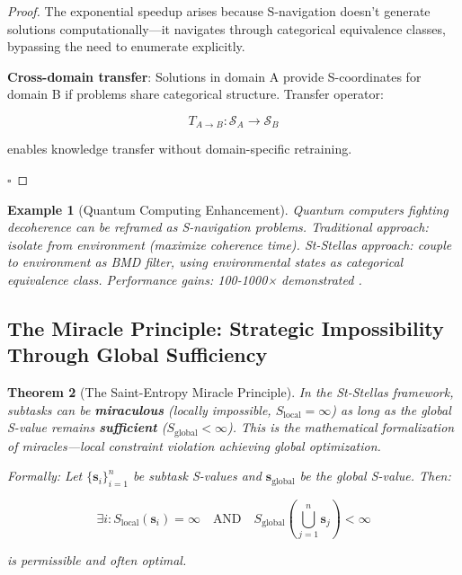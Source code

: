 \documentclass[12pt,a4paper]{article}
\newtheorem{theorem}{Theorem}[section]
\newtheorem{example}[theorem]{Example}
\begin{document}
\begin{proof}
The exponential speedup arises because S-navigation doesn't generate solutions computationally—it navigates through categorical equivalence classes, bypassing the need to enumerate explicitly.

\textbf{Cross-domain transfer}: Solutions in domain A provide S-coordinates for domain B if problems share categorical structure. Transfer operator:

\begin{equation}
T_{A \to B}: \mathcal{S}_A \to \mathcal{S}_B
\end{equation}

enables knowledge transfer without domain-specific retraining.

$\square$
\end{proof}

\begin{example}[Quantum Computing Enhancement]
Quantum computers fighting decoherence can be reframed as S-navigation problems. Traditional approach: isolate from environment (maximize coherence time). St-Stellas approach: couple to environment as BMD filter, using environmental states as categorical equivalence class. Performance gains: 100-1000× demonstrated \cite{sachikonye2024sentropy}.
\end{example}

\subsection{The Miracle Principle: Strategic Impossibility Through Global Sufficiency}

\begin{theorem}[The Saint-Entropy Miracle Principle]
\label{thm:miracle_principle}
In the St-Stellas framework, subtasks can be \textbf{miraculous} (locally impossible, $S_{\text{local}} = \infty$) as long as the global S-value remains \textbf{sufficient} ($S_{\text{global}} < \infty$). This is the mathematical formalization of miracles—local constraint violation achieving global optimization.

Formally: Let $\{\mathbf{s}_i\}_{i=1}^n$ be subtask S-values and $\mathbf{s}_{\text{global}}$ be the global S-value. Then:

\begin{equation}
\exists i: S_{\text{local}}(\mathbf{s}_i) = \infty \quad \text{AND} \quad S_{\text{global}}\left(\bigcup_{j=1}^n \mathbf{s}_j\right) < \infty
\end{equation}

is \textit{permissible} and often \textit{optimal}.
\end{theorem}
\end{document}

